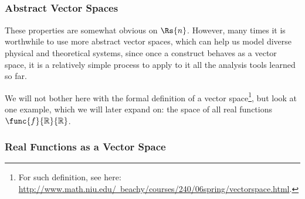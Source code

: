 \begin{frame}
\begin{itemize}
{\begin{presentation_example}
\begin{align*}
						\end{align*}
					\end{presentation_example}
			}
	\end{itemize}
\end{frame}

\begin{frame}
	\frametitle{Abstract Vector Spaces}
	These properties are somewhat obvious on $\Rs{n}$. However, many times it is worthwhile to use more abstract vector spaces, which can help us model diverse physical and theoretical systems, since once a construct behaves as a vector space, it is a relatively simple process to apply to it all the analysis tools learned so far.

	We will not bother here with the formal definition of a vector space\footnote{For such definition, see here: \href{http://www.math.niu.edu/~beachy/courses/240/06spring/vectorspace.html}{http://www.math.niu.edu/~beachy/courses/240/06spring/vectorspace.html}.}, but look at one example, which we will later expand on: the space of all real functions $\func{f}{\mathbb{R}}{\mathbb{R}}$.
\end{frame}

\begin{frame}
	\frametitle{Real Functions as a Vector Space}
	\begin{itemize}
	\end{itemize}
\end{frame}
